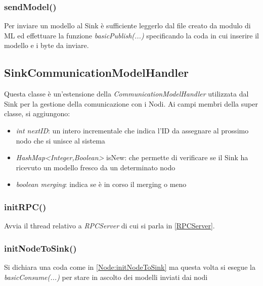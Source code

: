       \subsubsection{sendModel()}
        Per inviare un modello al Sink è sufficiente leggerlo dal file creato da modulo di ML ed effettuare la funzione \textit{basicPublish(...)} specificando la coda in cui inserire il modello e i byte da inviare.
        

    \subsection{SinkCommunicationModelHandler}
      Questa classe è un'estensione della \textit{CommunicationModelHandler} utilizzata dal Sink per la gestione della comunicazione con i Nodi. Ai campi membri della super classe, si aggiungono:
      \begin{itemize}
        \item \textit{int nextID}: un intero incrementale che indica l'ID da assegnare al prossimo nodo che si unisce al sistema
        \item \textit{HashMap<Integer,Boolean>} isNew: che permette di verificare se il Sink ha ricevuto un modello fresco da un determinato nodo
        \item \textit{boolean merging}: indica se è in corso il merging o meno
      \end{itemize}

      \subsubsection{initRPC()}
        Avvia il thread relativo a \textit{RPCServer} di cui si parla in \ref{RPCServer}.
        

      \subsubsection{initNodeToSink()}
        Si dichiara una coda come in \ref{Node:initNodeToSink} ma questa volta si esegue la \textit{basicConsume(...)} per stare in ascolto dei modelli inviati dai nodi
        


